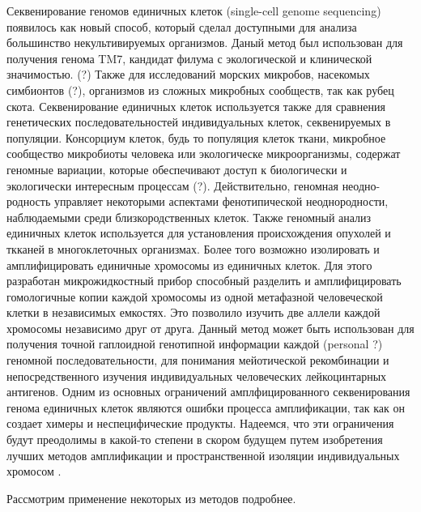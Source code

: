 Секвенирование геномов единичных клеток (single-cell genome sequencing) появилось как
новый способ, который сделал доступными для анализа большинство некультивируемых организмов. Даный метод был использован для получения генома TM7, кандидат филума с
экологической и клинической значимостью. (?) Также для исследований морских микробов,
насекомых симбионтов (?), организмов из сложных микробных сообществ, так как рубец
скота. Секвенирование единичных клеток используется также для сравнения генетических
последовательностей индивидуальных клеток, секвенируемых в популяции. Консорциум клеток, будь то популяция клеток ткани, микробное сообщество микробиоты человека или экологическе микроорганизмы, содержат геномные вариации, которые обеспечивают доступ к
биологически и экологически интересным процессам (?). Действительно, геномная неодно-
родность управляет некоторыми аспектами фенотипической неоднородности, наблюдаемыми
среди близкородственных клеток. Также геномный анализ единичных клеток используется
для установления происхождения опухолей и ткканей в многоклеточных организмах. Более того возможно изолировать и амплифицировать единичные хромосомы из единичных
клеток. Для этого разработан микрожидкостный прибор способный разделить и амплифицировать гомологичные копии каждой хромосомы из одной метафазной человеческой клетки
в независимых емкостях. Это позволило изучить две аллели каждой хромосомы независимо
друг от друга. Данный метод может быть использован для получения точной гаплоидной
генотипной информации каждой (personal ?) геномной последовательности, для понимания
мейотической рекомбинации и непосредственного изучения индивидуальных человеческих
лейкоцинтарных антигенов. Одним из основных ограничений амплфицированного секвенирования генома единичных клеток являются ошибки процесса амплификации, так как он
создает химеры и неспецифические продукты. Надеемся, что эти ограничения будут преодолимы в какой-то степени в скором будущем путем изобретения лучших методов амплификации и пространственной изоляции индивидуальных хромосом \cite{Kalisky2014, Roh2010}.

Рассмотрим применение некоторых из методов подробнее.


